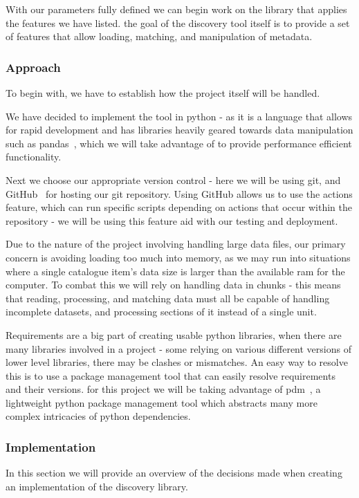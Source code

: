 With our parameters fully defined we can begin work on the library that applies the features we have listed.
the goal of the discovery tool itself is to provide a set of features that allow loading, matching, and manipulation
of metadata.

\subsubsection{Approach}
To begin with, we have to establish how the project itself will be handled.

We have decided to implement the tool in python - as it is a language that allows for rapid development and has
libraries heavily geared towards data manipulation such as pandas~\cite{pythonpandas}, which we will take advantage of
to provide performance efficient functionality.

Next we choose our appropriate version control - here we will be using git, and GitHub~\cite{github} for hosting our git
repository.
Using GitHub allows us to use the actions feature, which can run specific scripts depending on actions that occur within
the repository - we will be using this feature aid with our testing and deployment.

Due to the nature of the project involving handling large data files, our primary concern is avoiding loading too much
into memory, as we may run into situations where a single catalogue item's data size is larger than the available ram
for the computer.
To combat this we will rely on handling data in chunks - this means that reading, processing, and matching data must
all be capable of handling incomplete datasets, and processing sections of it instead of a single unit.

Requirements are a big part of creating usable python libraries, when there are many libraries involved in a project -
some relying on various different versions of lower level libraries, there may be clashes or mismatches.
An easy way to resolve this is to use a package management tool that can easily resolve requirements and their versions.
for this project we will be taking advantage of pdm~\cite{pythonpdm}, a lightweight python package management tool which
abstracts many more complex intricacies of python dependencies.

\subsubsection{Implementation}
In this section we will provide an overview of the decisions made when creating an implementation of the discovery
library.


